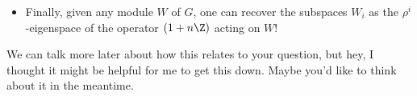 \documentclass[11pt]{article}
\begin{document}
\begin{Minseon Chat on Rep thy}
\begin{itemize}
\begin{itemize}
\item Finally, given any module $W$ of $G$, one can recover the subspaces $W_i$ as the $\rho^i$-eigenspace of the operator $(1+n\Z)$ acting on $W$!
\end{itemize}
\end{itemize}
We can talk more later about how this relates to your question, but hey, I thought it might be helpful for me to get this down. Maybe you'd like to think about it in the meantime.
%
\end{Minseon Chat on Rep thy}
\end{document}
